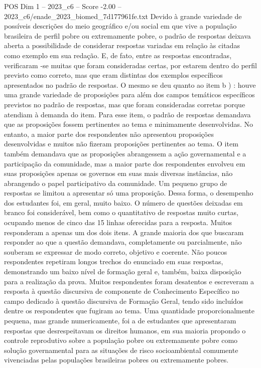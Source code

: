 \begin{textsample}{POS Dim 1 – 2023\_c6 – Score -2.00 – 2023\_c6/enade\_2023\_biomed\_7d177961fe.txt}
Devido à grande variedade de possíveis descrições do meio geográfico e/ou social em que vive a população brasileira de perfil pobre ou extremamente pobre, o padrão de respostas deixava aberta a possibilidade de considerar respostas variadas em relação às citadas como exemplo em sua redação.
E, de fato, entre as respostas encontradas, verificaram -se muitas que foram consideradas certas, por estarem dentro do perfil previsto como correto, mas que eram distintas dos exemplos específicos apresentados no padrão de respostas.
O mesmo se deu quanto ao item b ) : houve uma grande variedade de proposições para além dos campos temáticos específicos previstos no padrão de respostas, mas que foram consideradas corretas porque atendiam à demanda do item.
Para esse item, o padrão de respostas demandava que as proposições fossem pertinentes ao tema e minimamente desenvolvidas.
No entanto, a maior parte dos respondentes não apresentou proposições desenvolvidas e muitos não fizeram proposições pertinentes ao tema.
O item também demandava que as proposições abrangessem a ação governamental e a participação da comunidade, mas a maior parte dos respondentes envolveu em suas proposições apenas os governos em suas mais diversas instâncias, não abrangendo o papel participativo da comunidade.
Um pequeno grupo de respostas se limitou a apresentar só uma proposição.
Dessa forma, o desempenho dos estudantes foi, em geral, muito baixo.
O número de questões deixadas em branco foi considerável, bem como o quantitativo de respostas muito curtas, ocupando menos de cinco das 15 linhas oferecidas para a resposta.
Muitos responderam a apenas um dos dois itens.
A grande maioria dos que buscaram responder ao que a questão demandava, completamente ou parcialmente, não souberam se expressar de modo correto, objetivo e coerente.
Não poucos respondentes repetiram longos trechos do enunciado em suas respostas, demonstrando um baixo nível de formação geral e, também, baixa disposição para a realização da prova.
Muitos respondentes foram desatentos e escreveram a resposta à questão discursiva de componente de Conhecimento Específico no campo dedicado à questão discursiva de Formação Geral, tendo sido incluídos dentre os respondentes que fugiram ao tema.
Uma quantidade proporcionalmente pequena, mas grande numericamente, foi a de estudantes que apresentaram respostas que desrespeitavam os direitos humanos, em sua maioria propondo o controle reprodutivo sobre a população pobre ou extremamente pobre como solução governamental para as situações de risco socioambiental comumente vivenciadas pelas populações brasileiras pobres ou extremamente pobres.

\end{textsample}
